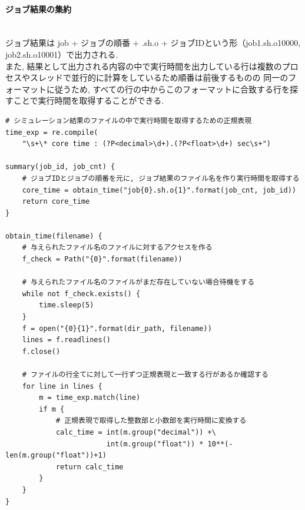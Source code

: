 \paragraph{ジョブ結果の集約}~\\
ジョブ結果は job + ジョブの順番 + .sh.o + ジョブIDという形（job1.sh.o10000, job2.sh.o10001）で出力される.\\
また, 結果として出力される内容の中で実行時間を出力している行は複数のプロセスやスレッドで並行的に計算をしているため順番は前後するものの
同一のフォーマットに従うため, すべての行の中からこのフォーマットに合致する行を探すことで実行時間を取得することができる.\\
{\footnotesize
\begin{lstlisting}[numbers=none, caption=ジョブ結果の集約　疑似コード]
# シミュレーション結果のファイルの中で実行時間を取得するための正規表現
time_exp = re.compile(
    "\s+\* core time : (?P<decimal>\d+).(?P<float>\d+) sec\s+")

summary(job_id, job_cnt) {
    # ジョブIDとジョブの順番を元に, ジョブ結果のファイル名を作り実行時間を取得する
    core_time = obtain_time("job{0}.sh.o{1}".format(job_cnt, job_id))
    return core_time
}

obtain_time(filename) {
    # 与えられたファイル名のファイルに対するアクセスを作る
    f_check = Path("{0}".format(filename))

    # 与えられたファイル名のファイルがまだ存在していない場合待機をする
    while not f_check.exists() {
        time.sleep(5)
    }
    f = open("{0}{1}".format(dir_path, filename))
    lines = f.readlines()
    f.close()

    # ファイルの行全てに対して一行ずつ正規表現と一致する行があるか確認する
    for line in lines {
        m = time_exp.match(line)
        if m {
            # 正規表現で取得した整数部と小数部を実行時間に変換する
            calc_time = int(m.group("decimal")) +\
                        int(m.group("float")) * 10**(-len(m.group("float"))+1)
            return calc_time
        }
    }
}
\end{lstlisting}
}

